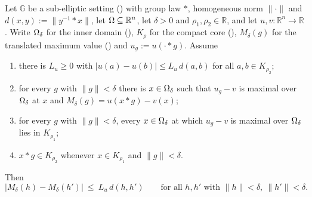\begin{lemma}[Lemma~3.5, (3.12)]
Let $\mathbb G$ be a sub-elliptic setting () with group law $*$,
homogeneous norm $\|\cdot\|$ and $d(x,y):=\|y^{-1}*x\|$, let
$\Omega\subseteq\mathbb R^{n}$, let $\delta>0$ and $\rho_1,\rho_2\in\mathbb R$, and let
$u,v:\mathbb R^{n}\to\mathbb R$. Write $\Omega_\delta$ for the inner domain
(), $K_\rho$ for the compact core (),
$M_\delta(g)$ for the translated maximum value () and
$u_g:=u(\cdot*g)$. Assume
\begin{enumerate}
\item there is $L_u\ge0$ with $|u(a)-u(b)|\le L_u\,d(a,b)$ for all $a,b\in K_{\rho_2}$;
\item for every $g$ with $\|g\|<\delta$ there is $x\in\Omega_\delta$ such that $u_g-v$ is
  maximal over $\Omega_\delta$ at $x$ and $M_\delta(g)=u(x*g)-v(x)$;
\item for every $g$ with $\|g\|<\delta$, every $x\in\Omega_\delta$ at which $u_g-v$ is maximal
  over $\Omega_\delta$ lies in $K_{\rho_1}$;
\item $x*g\in K_{\rho_2}$ whenever $x\in K_{\rho_1}$ and $\|g\|<\delta$.
\end{enumerate}
Then
\[
 \big|M_\delta(h)-M_\delta(h')\big|\ \le\ L_u\,d(h,h')
 \qquad\text{for all }h,h'\text{ with }\|h\|<\delta,\ \|h'\|<\delta .
\]
\end{lemma}
